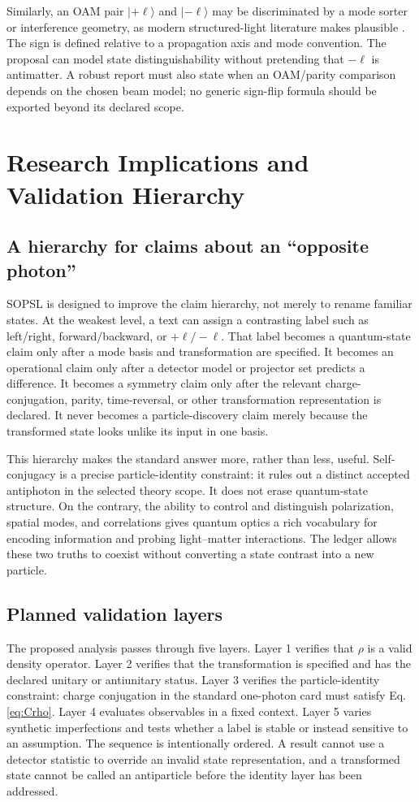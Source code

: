 \documentclass[conference]{../../../../Conference-LaTeX-template_10-17-19/IEEEtran}
\begin{document}
Similarly, an OAM pair $\lvert+\ell\rangle$ and $\lvert-\ell\rangle$ may be discriminated by a mode sorter or interference geometry, as modern structured-light literature makes plausible \cite{krenn2017,leach2009,erhard2017}. The sign is defined relative to a propagation axis and mode convention. The proposal can model state distinguishability without pretending that $-\ell$ is antimatter. A robust report must also state when an OAM/parity comparison depends on the chosen beam model; no generic sign-flip formula should be exported beyond its declared scope.

\section{Research Implications and Validation Hierarchy}
\subsection{A hierarchy for claims about an ``opposite photon''}
SOPSL is designed to improve the claim hierarchy, not merely to rename familiar states. At the weakest level, a text can assign a contrasting label such as left/right, forward/backward, or $+\ell/-\ell$. That label becomes a quantum-state claim only after a mode basis and transformation are specified. It becomes an operational claim only after a detector model or projector set predicts a difference. It becomes a symmetry claim only after the relevant charge-conjugation, parity, time-reversal, or other transformation representation is declared. It never becomes a particle-discovery claim merely because the transformed state looks unlike its input in one basis.

This hierarchy makes the standard answer more, rather than less, useful. Self-conjugacy is a precise particle-identity constraint: it rules out a distinct accepted antiphoton in the selected theory scope. It does not erase quantum-state structure. On the contrary, the ability to control and distinguish polarization, spatial modes, and correlations gives quantum optics a rich vocabulary for encoding information and probing light--matter interactions. The ledger allows these two truths to coexist without converting a state contrast into a new particle.

\subsection{Planned validation layers}
The proposed analysis passes through five layers. Layer 1 verifies that $\rho$ is a valid density operator. Layer 2 verifies that the transformation is specified and has the declared unitary or antiunitary status. Layer 3 verifies the particle-identity constraint: charge conjugation in the standard one-photon card must satisfy Eq. \eqref{eq:Crho}. Layer 4 evaluates observables in a fixed context. Layer 5 varies synthetic imperfections and tests whether a label is stable or instead sensitive to an assumption. The sequence is intentionally ordered. A result cannot use a detector statistic to override an invalid state representation, and a transformed state cannot be called an antiparticle before the identity layer has been addressed.
\end{document}
